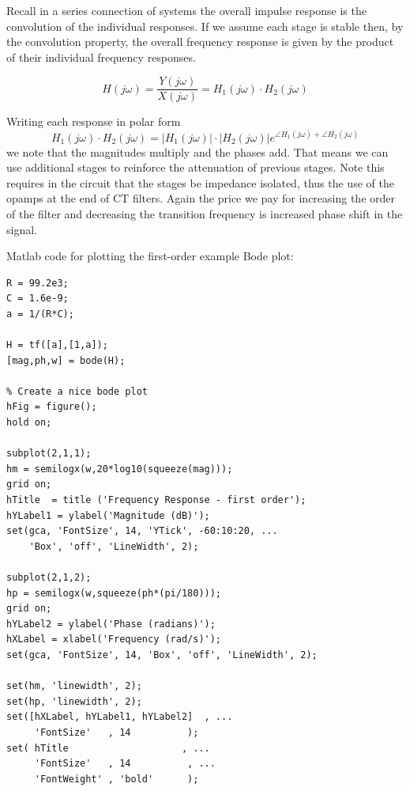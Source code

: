 Recall in a series connection of systems the overall impulse response is the convolution of the individual responses. If  we assume each stage is stable then, by the convolution property, the overall frequency response is given by the product of their individual frequency responses.
\begin{center}
\end{center}

\[
H(j\omega) = \frac{Y(j\omega)}{X(j\omega)} = H_1(j\omega)\cdot H_2(j\omega)
\]

Writing each response in polar form
\[
H_1(j\omega)\cdot H_2(j\omega) = |H_1(j\omega)|\cdot |H_2(j\omega)| e^{\angle H_1(j\omega)+ \angle H_2(j\omega)}
\]
we note that the magnitudes multiply and the phases add. That means we can use additional stages to reinforce the attenuation of previous stages. Note this requires in the circuit that the stages be impedance isolated, thus the use of the opamps at the end of CT filters. Again the price we pay for increasing the order of the filter and decreasing the transition frequency is increased phase shift in the signal.

\newpage
Matlab code for plotting the first-order example Bode plot:
\begin{verbatim}
R = 99.2e3;
C = 1.6e-9;
a = 1/(R*C);

H = tf([a],[1,a]);
[mag,ph,w] = bode(H);

% Create a nice bode plot 
hFig = figure();
hold on;

subplot(2,1,1);
hm = semilogx(w,20*log10(squeeze(mag)));
grid on;
hTitle  = title ('Frequency Response - first order');
hYLabel1 = ylabel('Magnitude (dB)');
set(gca, 'FontSize', 14, 'YTick', -60:10:20, ...
    'Box', 'off', 'LineWidth', 2);

subplot(2,1,2);
hp = semilogx(w,squeeze(ph*(pi/180)));
grid on;
hYLabel2 = ylabel('Phase (radians)');
hXLabel = xlabel('Frequency (rad/s)');
set(gca, 'FontSize', 14, 'Box', 'off', 'LineWidth', 2);

set(hm, 'linewidth', 2);
set(hp, 'linewidth', 2);
set([hXLabel, hYLabel1, hYLabel2]  , ...
     'FontSize'   , 14          );
set( hTitle                    , ...
     'FontSize'   , 14          , ...
     'FontWeight' , 'bold'      );
\end{verbatim}

